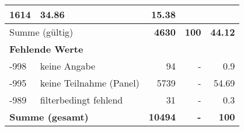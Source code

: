 \begin{longtable}{lXrrr}
       \num{1614} &
       \num[round-mode=places,round-precision=2]{34.86} &
         \num[round-mode=places,round-precision=2]{15.38} \\
     \midrule
     \multicolumn{2}{l}{Summe (gültig)} &
       \textbf{\num{4630}} &
     \textbf{\num{100}} &
       \textbf{\num[round-mode=places,round-precision=2]{44.12}} \\
     \multicolumn{5}{l}{\textbf{Fehlende Werte}}\\
       -998 &
       keine Angabe &
         \num{94} &
        - &
         \num[round-mode=places,round-precision=2]{0.9} \\
       -995 &
       keine Teilnahme (Panel) &
         \num{5739} &
        - &
         \num[round-mode=places,round-precision=2]{54.69} \\
       -989 &
       filterbedingt fehlend &
         \num{31} &
        - &
         \num[round-mode=places,round-precision=2]{0.3} \\
     \midrule
     \multicolumn{2}{l}{\textbf{Summe (gesamt)}} &
          \textbf{\num{10494}} &
        \textbf{-} &
        \textbf{\num{100}} \\
     \bottomrule
     \end{longtable}
     
